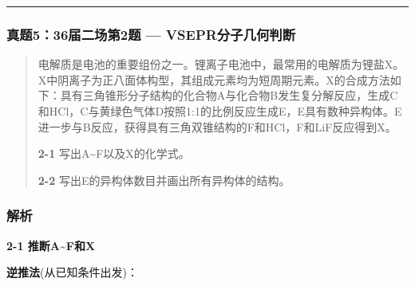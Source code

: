 \begin{center}\rule{0.5\linewidth}{0.5pt}\end{center}

\subsubsection{真题5：36届二场第2题 --- VSEPR分子几何判断}\label{ux771fux9898536ux5c4aux4e8cux573aux7b2c2ux9898-vseprux5206ux5b50ux51e0ux4f55ux5224ux65ad}

\begin{quote}
电解质是电池的重要组份之一。锂离子电池中，最常用的电解质为锂盐X。X中阴离子为正八面体构型，其组成元素均为短周期元素。X的合成方法如下：具有三角锥形分子结构的化合物A与化合物B发生复分解反应，生成C和HCl，C与黄绿色气体D按照1:1的比例反应生成E，E具有数种异构体。E进一步与B反应，获得具有三角双锥结构的F和HCl，F和LiF反应得到X。

\textbf{2-1} 写出A\textasciitilde F以及X的化学式。

\textbf{2-2} 写出E的异构体数目并画出所有异构体的结构。
\end{quote}

\subsubsection{解析}\label{ux89e3ux6790-4}

\textbf{2-1 推断A\textasciitilde F和X}

\textbf{逆推法}(从已知条件出发)：

